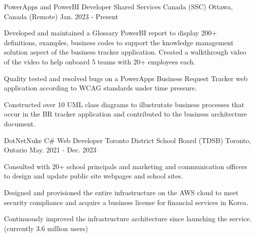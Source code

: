 

\begin{cventries}

  \cventry
    {PowerApps and PowerBI Developer} %
    {Shared Services Canada (SSC)} %
    {Ottawa, Canada (Remote)} %
    {Jan. 2023 - Present} %
    {
      \begin{cvitems} %
        \item {Developed and maintained a Glossary PowerBI report to display 200+ definitions, examples, business codes to support the knowledge management solution aspect of the business tracker application. Created a walkthrough video of the video to help onboard 5 teams with 20+ employees each. }
        \item {Quality tested and resolved bugs on a PowerApps Business Request Tracker web application according to WCAG standards under time pressure.  }
        \item {Constructed over 10 UML class diagrams to illustrutate business processes that occur in the BR tracker application and contributed to the business architecture document.}
      \end{cvitems}
    }

\cventry
    {DotNetNuke C\# Web Developer} %
    {Toronto District School Board (TDSB)} %
    {Toronto, Ontario} %
    {May. 2021 - Dec. 2023} %
    {
      \begin{cvitems} %
        \item {Consulted with 20+ school principals and marketing and communication officers to design and update public site webpages and school sites.  }
        \item {Designed and provisioned the entire infrastructure on the AWS cloud to meet security compliance and acquire a business license for financial services in Korea.}
        \item {Continuously improved the infrastructure architecture since launching the service. (currently 3.6 million users)}
      \end{cvitems}
    }


\end{cventries}

